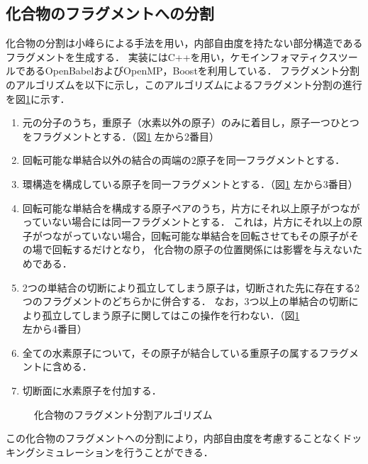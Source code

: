 \subsection{化合物のフラグメントへの分割}\label{subsec:decomposition}
化合物の分割は小峰らによる手法\cite{Shunta2015}を用い，内部自由度を持たない部分構造であるフラグメントを生成する．
実装にはC++を用い，ケモインフォマティクスツールであるOpenBabel\cite{OBoyle2011}およびOpenMP，Boostを利用している．
フラグメント分割のアルゴリズムを以下に示し，このアルゴリズムによるフラグメント分割の進行を図\ref{fig:decomposition}に示す．
\begin{enumerate} 
\item 元の分子のうち，重原子（水素以外の原子）のみに着目し，原子一つひとつをフラグメントとする．（図\ref{fig:decomposition} 左から2番目）
\item 回転可能な単結合以外の結合の両端の2原子を同一フラグメントとする．
\item 環構造を構成している原子を同一フラグメントとする．（図\ref{fig:decomposition} 左から3番目）
\item 回転可能な単結合を構成する原子ペアのうち，片方にそれ以上原子がつながっていない場合には同一フラグメントとする．
	これは，片方にそれ以上の原子がつながっていない場合，回転可能な単結合を回転させてもその原子がその場で回転するだけとなり，
	化合物の原子の位置関係には影響を与えないためである．
\item 2つの単結合の切断により孤立してしまう原子は，切断された先に存在する2つのフラグメントのどちらかに併合する．
	なお，3つ以上の単結合の切断により孤立してしまう原子に関してはこの操作を行わない．（図\ref{fig:decomposition} 左から4番目）
\item 全ての水素原子について，その原子が結合している重原子の属するフラグメントに含める．
\item 切断面に水素原子を付加する．
\end{enumerate}
\begin{figure}[htp]
 \begin{center}
  \caption{化合物のフラグメント分割アルゴリズム\cite{Shunta2015}}
  \label{fig:decomposition}
 \end{center}
\end{figure}
この化合物のフラグメントへの分割により，内部自由度を考慮することなくドッキングシミュレーションを行うことができる．

